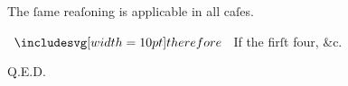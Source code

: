 \documentclass[12pt,preview]{standalone}
\begin{document}
\begin{minipage}{\textwidth}
    \hfill

    \hfill

    The ſame reaſoning is applicable in all caſes.

    \hfill

    $\btherefore$ If the firſt four, \&c.

    \hfill

    \hfill Q.E.D.
\end{minipage}
\end{document}
